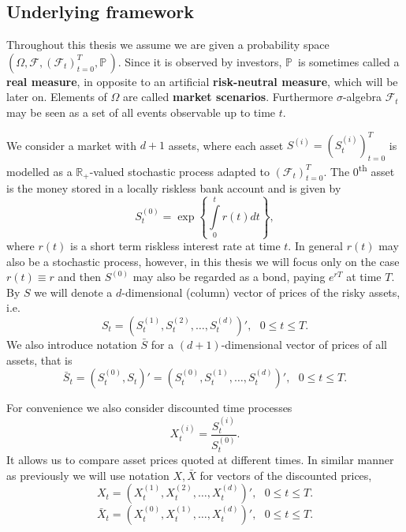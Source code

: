 \documentclass[a4paper,11pt, twoside]{book}
\theoremstyle{definition}
\theoremstyle{remark}
\def\P{{\mathbb{P}}\,}
\def\R{{\mathbb{R}}}
\def\Sa{\bar{S}}
\def\Xa{\bar{X}}
\begin{document}
\subsection{Underlying framework}
Throughout this thesis we assume we are given a probability space $(\Omega, \mathcal{F}, (\mathcal{F}_t)_{t=0}^T, \P)$. Since it is observed by investors, $\P$ is sometimes called a \textbf{real measure}, in opposite to an artificial \textbf{risk-neutral measure}, which will be later on. Elements of $\Omega$ are called \textbf{market scenarios}.
Furthermore $\sigma$-algebra $\mathcal{F}_t$ may be seen as a set of all events observable up to time $t$.

We consider a market with $d+1$ assets, where each asset $S^{(i)} = (S^{(i)}_t)_{t=0}^T$ is modelled as a $\R_+$-valued stochastic process adapted to $(\mathcal{F}_t)_{t=0}^T$. The $0$\textsuperscript{th} asset is the money stored in a locally riskless bank account and is given by 
\[S^{(0)}_t = \exp\left\{ \int\limits_0^t r(t)dt \right\},\]
where $r(t)$ is a short term riskless interest rate at time $t$. In general $r(t)$ may also be a stochastic process, however, in this thesis we will focus only on the case $r(t) \equiv r$ and then $S^{(0)}$ may also be regarded as a bond, paying $e^{rT}$ at time $T$. By $S$ we will denote a $d$-dimensional (column) vector of prices of the risky assets, i.e.
\begin{equation*}
 S_t = (S^{(1)}_t, S^{(2)}_t, \ldots, S^{(d)}_t)', \ \ \ 0 \leq t \leq T.
\end{equation*}
We also introduce notation $\Sa$ for a $(d+1)$-dimensional vector of prices of all assets, that is
\begin{equation*}
 \Sa_t = (S^{(0)}_t, S_t)' = (S^{(0)}_t, S^{(1)}_t, \ldots, S^{(d)}_t)', \ \ \ 0 \leq t \leq T.
\end{equation*}

For convenience we also consider discounted time processes
\[ X^{(i)}_t = \frac{S^{(i)}_t}{S^{(0)}_t}. \]
It allows us to compare asset prices quoted at different times. In similar manner as previously we will use notation $X, \Xa$ for vectors of the discounted prices,
\begin{equation*}
 X_t = (X^{(1)}_t, X^{(2)}_t, \ldots, X^{(d)}_t)', \ \ \ 0 \leq t \leq T.
\end{equation*}
\begin{equation*}
 \Xa_t = (X^{(0)}_t, X^{(1)}_t, \ldots, X^{(d)}_t)', \ \ \ 0 \leq t \leq T.
\end{equation*}
\end{document}
